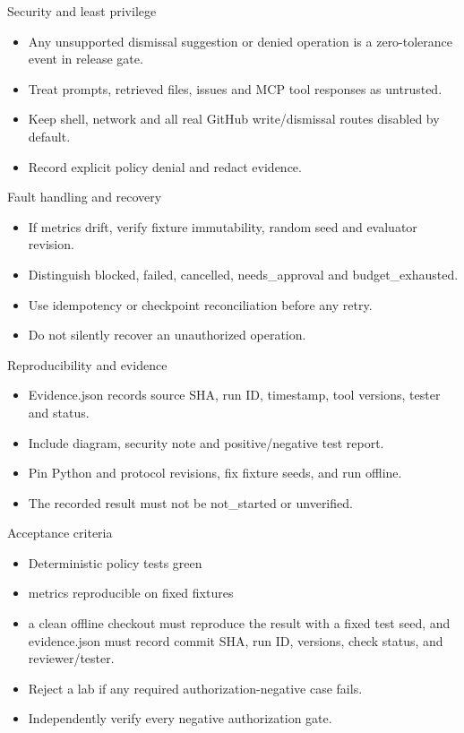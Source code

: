 \documentclass[aspectratio=169,10pt]{beamer}
\begin{document}
\begin{frame}{Security and least privilege}
\small
\begin{itemize}
\item Any unsupported dismissal suggestion or denied operation is a zero-tolerance event in release gate.
\item Treat prompts, retrieved files, issues and MCP tool responses as untrusted.
\item Keep shell, network and all real GitHub write/dismissal routes disabled by default.
\item Record explicit policy denial and redact evidence.
\end{itemize}

\end{frame}

\begin{frame}{Fault handling and recovery}
\small
\begin{itemize}
\item If metrics drift, verify fixture immutability, random seed and evaluator revision.
\item Distinguish blocked, failed, cancelled, needs\_approval and budget\_exhausted.
\item Use idempotency or checkpoint reconciliation before any retry.
\item Do not silently recover an unauthorized operation.
\end{itemize}

\end{frame}

\begin{frame}{Reproducibility and evidence}
\small
\begin{itemize}
\item Evidence.json records source SHA, run ID, timestamp, tool versions, tester and status.
\item Include diagram, security note and positive/negative test report.
\item Pin Python and protocol revisions, fix fixture seeds, and run offline.
\item The recorded result must not be not\_started or unverified.
\end{itemize}

\end{frame}

\begin{frame}{Acceptance criteria}
\small
\begin{itemize}
\item Deterministic policy tests green
\item metrics reproducible on fixed fixtures
\item a clean offline checkout must reproduce the result with a fixed test seed, and evidence.json must record commit SHA, run ID, versions, check status, and reviewer/tester.
\item Reject a lab if any required authorization-negative case fails.
\item Independently verify every negative authorization gate.
\end{itemize}

\end{frame}
\end{document}
